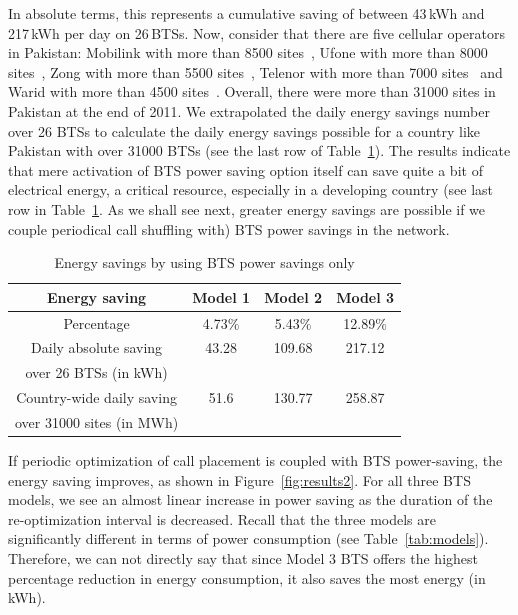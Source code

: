 In absolute terms, this represents a cumulative saving of between 43\,kWh and 217\,kWh per day on 26\,BTSs. Now, consider that there are five cellular operators in Pakistan: Mobilink with more than 8500 sites~\cite{mobilinksitecount}, Ufone with more than 8000 sites~\cite{ptaannreport}, Zong with more than 5500 sites~\cite{ptaannreport}, Telenor with more than 7000 sites~\cite{telenorsitecount} and Warid with more than 4500 sites~\cite{ptaannreport}. Overall, there were more than 31000 sites in Pakistan at the end of 2011. We extrapolated the daily energy savings number over 26 BTSs to calculate the daily energy savings possible for a country like Pakistan with over 31000 BTSs (see the last row of Table~\ref{tab:psonly}). The results indicate that mere activation of BTS power saving option itself can save quite a bit of electrical energy, a critical resource, especially in a developing country (see last row in Table~\ref{tab:psonly}. As we shall see next, greater energy savings are possible if we couple periodical call shuffling with) BTS power savings in the network.

\begin{table}
\centering
\begin{tabular}{|c|c|c|c|}
\hline Energy saving & Model 1 & Model 2 & Model 3 \\
\hline Percentage & 4.73\% & 5.43\% & 12.89\% \\
\hline Daily absolute saving & 43.28 & 109.68 & 217.12 \\
over 26 BTSs (in kWh) & \ & \ & \ \\
\hline Country-wide daily saving & 51.6 & 130.77 & 258.87\\
over 31000 sites (in MWh) & \ & \ & \ \\
\hline
\end{tabular}
\vspace{+0.1in}
\caption{Energy savings by using BTS power savings only}
\label{tab:psonly}
\end{table}

If periodic optimization of call placement is coupled with BTS power-saving, the energy saving improves, as shown in Figure~\ref{fig:results2}. For all three BTS models, we see an almost linear increase in power saving as the duration of the re-optimization interval is decreased. Recall that the three models are significantly different in terms of power consumption (see Table~\ref{tab:models}). Therefore, we can not directly say that since Model 3 BTS offers the highest percentage reduction in energy consumption, it also saves the most energy (in kWh).

